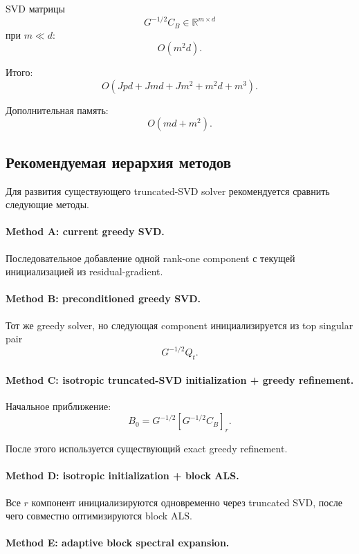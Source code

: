 SVD матрицы
\[
    G^{-1/2}C_B\in\mathbb R^{m\times d}
\]
при $m\ll d$:
\[
    O(m^2d).
\]

Итого:
\[
\boxed{
    O(
        Jpd
        +
        Jmd
        +
        Jm^2
        +
        m^2d
        +
        m^3
    ).
}
\]

Дополнительная память:
\[
\boxed{
    O(md+m^2).
}
\]

\subsection{Рекомендуемая иерархия методов}

Для развития существующего truncated-SVD solver рекомендуется
сравнить следующие методы.

\paragraph{Method A: current greedy SVD.}

Последовательное добавление одной rank-one component с текущей
инициализацией из residual-gradient.

\paragraph{Method B: preconditioned greedy SVD.}

Тот же greedy solver, но следующая component инициализируется
из top singular pair
\[
    G^{-1/2}Q_t.
\]

\paragraph{Method C: isotropic truncated-SVD initialization + greedy refinement.}

Начальное приближение:
\[
    B_0
    =
    G^{-1/2}
    [G^{-1/2}C_B]_r.
\]

После этого используется существующий exact greedy refinement.

\paragraph{Method D: isotropic initialization + block ALS.}

Все $r$ компонент инициализируются одновременно через truncated SVD,
после чего совместно оптимизируются block ALS.

\paragraph{Method E: adaptive block spectral expansion.}

